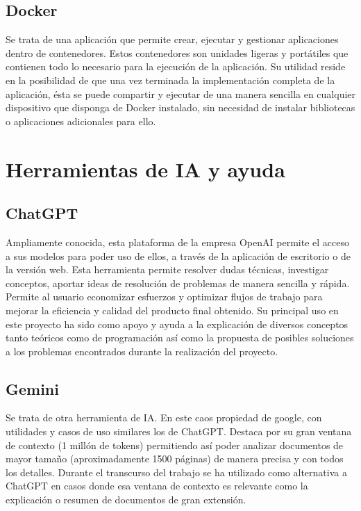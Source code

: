 \subsection{Docker}
Se trata de una aplicación que permite crear, ejecutar y gestionar aplicaciones dentro de contenedores\cite{DockerDocs2025}. Estos contenedores son unidades ligeras y portátiles que contienen todo lo necesario para la ejecución de la aplicación. Su utilidad reside en la posibilidad de que una vez terminada la implementación completa de la aplicación, ésta se puede compartir y ejecutar de una manera sencilla en cualquier dispositivo que disponga de Docker instalado, sin necesidad de instalar bibliotecas o aplicaciones adicionales para ello.


\section{Herramientas de IA y ayuda}

\subsection{ChatGPT}
Ampliamente conocida, esta plataforma de la empresa OpenAI permite el acceso a sus modelos para poder uso de ellos, a través de la aplicación de escritorio o de la versión web. Esta herramienta permite resolver dudas técnicas, investigar conceptos, aportar ideas de resolución de problemas de manera sencilla y rápida. Permite al usuario economizar esfuerzos y optimizar flujos de trabajo para mejorar la eficiencia y calidad del producto final obtenido\cite{ChatGPT2025}. Su principal uso en este proyecto ha sido como apoyo y ayuda a la explicación de diversos conceptos tanto teóricos como de programación así como la propuesta de posibles soluciones a los problemas encontrados durante la realización del proyecto.

\subsection{Gemini}
Se trata de otra herramienta de IA. En este caos propiedad de google, con utilidades y casos de uso similares  los de ChatGPT. Destaca por su gran ventana de contexto (1 millón de tokens) permitiendo así poder analizar documentos de mayor tamaño (aproximadamente 1500 páginas) de manera precisa y con todos los detalles\cite{Gemini2025}. Durante el transcurso del trabajo se ha utilizado como alternativa a ChatGPT en casos donde esa ventana de contexto es relevante como la explicación o resumen de documentos de gran extensión.

